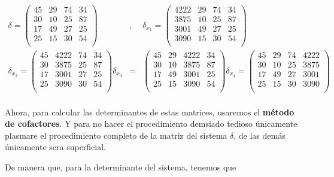 \documentclass[12pt, landscape]{article}
\begin{document}
	\begin{eqnarray*}
		\delta = \begin{pmatrix}
					45 & 29 & 74 & 34 \\
					30 & 10 & 25 & 87 \\
					17 & 49 & 27 & 25 \\
					25 & 15 & 30 & 54 \\
				\end{pmatrix} &,&
		\delta_{x_1} = \begin{pmatrix}
					4222 & 29 & 74 & 34 \\
					3875 & 10 & 25 & 87 \\
					3001 & 49 & 27 & 25 \\
					3090 & 15 & 30 & 54 \\
				\end{pmatrix} \\
		\delta_{x_2} = \begin{pmatrix}
					45 & 4222 & 74 & 34 \\
					30 & 3875 & 25 & 87 \\
					17 & 3001 & 27 & 25 \\
					25 & 3090 & 30 & 54 \\
				\end{pmatrix} 
		\delta_{x_3} &=& \begin{pmatrix}
					45 & 29 & 4222 & 34 \\
					30 & 10 & 3875 & 87 \\
					17 & 49 & 3001 & 25 \\
					25 & 15 & 3090 & 54 \\
				\end{pmatrix}
		\delta_{x_4} = \begin{pmatrix}
					45 & 29 & 74 & 4222 \\
					30 & 10 & 25 & 3875 \\
					17 & 49 & 27 & 3001 \\
					25 & 15 & 30 & 3090 \\
				\end{pmatrix} \\
	\end{eqnarray*}
	
	\par Ahora, para calcular las determinantes de estas matrices, usaremos el \textbf{m\'etodo de cofactores}. Y para no hacer el procedimiento demsiado tedioso \'unicamente plasmare el procedimiento completo de la matriz del sistema $\delta$, de las dem\'as \'unicamente sera superficial. 
	\par De manera que, para la determinante del sistema, tenemos que
	
\end{document}
